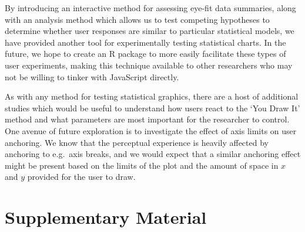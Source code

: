 \documentclass[
]{jds}
\begin{document}
By introducing an interactive method for assessing eye-fit data
summaries, along with an analysis method which allows us to test
competing hypotheses to determine whether user responses are similar to
particular statistical models, we have provided another tool for
experimentally testing statistical charts. In the future, we hope to
create an R package to more easily facilitate these types of user
experiments, making this technique available to other researchers who
may not be willing to tinker with JavaScript directly.

As with any method for testing statistical graphics, there are a host of
additional studies which would be useful to understand how users react
to the `You Draw It' method and what parameters are most important for
the researcher to control. One avenue of future exploration is to
investigate the effect of axis limits on user anchoring. We know that
the perceptual experience is heavily affected by anchoring to e.g.~axis
breaks, and we would expect that a similar anchoring effect might be
present based on the limits of the plot and the amount of space in \(x\)
and \(y\) provided for the user to draw.

\hypertarget{supplementary-material}{%
\section*{Supplementary Material}\label{supplementary-material}}
\end{document}
